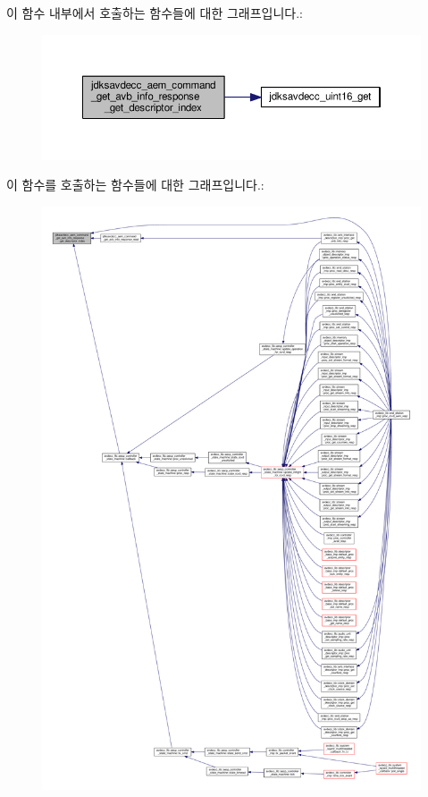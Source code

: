 이 함수 내부에서 호출하는 함수들에 대한 그래프입니다.\+:
\nopagebreak
\begin{figure}[H]
\begin{center}
\leavevmode
\includegraphics[width=350pt]{group__command__get__avb__info__response_gad4356122ebdad47f8c63588a4c48d2e7_cgraph}
\end{center}
\end{figure}




이 함수를 호출하는 함수들에 대한 그래프입니다.\+:
\nopagebreak
\begin{figure}[H]
\begin{center}
\leavevmode
\includegraphics[width=350pt]{group__command__get__avb__info__response_gad4356122ebdad47f8c63588a4c48d2e7_icgraph}
\end{center}
\end{figure}


